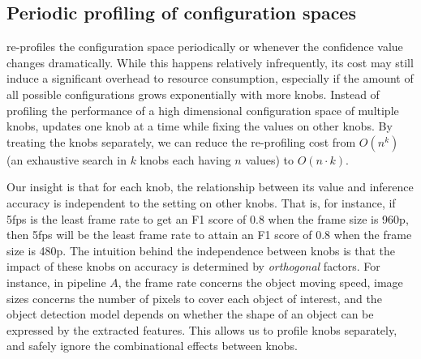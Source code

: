 

\subsection{Periodic profiling of configuration spaces}

\name re-profiles the configuration space periodically or
whenever the confidence value changes dramatically.
While this happens relatively infrequently, its cost may
still induce a significant overhead to resource consumption,
especially if the amount of all possible configurations grows
exponentially with more knobs.
Instead of profiling the performance of a high 
dimensional configuration space of multiple knobs, \name
updates one knob at a time while fixing the values on other
knobs.
By treating the knobs separately, we can reduce the 
re-profiling cost from $O(n^k)$ (an exhaustive search in $k$
knobs each having $n$ values) to $O(n\cdot k)$.

Our insight is that 
for each knob, the relationship between its value and inference 
accuracy is independent to the setting on other knobs. 
That is, for instance, if 5fps is the least frame rate to get an F1 
score of 0.8 when the frame size is 960p, then 5fps will be the
least frame rate to attain an F1 score of 0.8 when the frame size 
is 480p.
The intuition behind the independence between knobs is that the 
impact of these knobs on accuracy is determined by {\em orthogonal} 
factors. 
For instance, in pipeline $A$, the frame rate concerns the object
moving speed, image sizes concerns the number of pixels to cover 
each object of interest, and the object detection model depends on 
whether the shape of an object can be expressed by the extracted 
features.
This allows us to profile knobs separately, and safely ignore the 
combinational effects between knobs.

